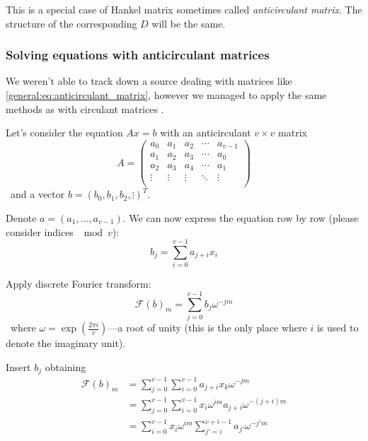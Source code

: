     This is a special case of Hankel matrix sometimes called \emph{anticirculant matrix}. The structure of the corresponding $D$ will be the same.
    
    \subsubsection{Solving equations with anticirculant matrices}
    \label{general:sec:anticirculant}
        We weren't able to track down a source dealing with matrices like \eqref{general:eq:anticirculant_matrix}, however we managed to apply the same methods as with circulant matrices \cite{wiki:circulant_matrix}.
        
        Let's consider the equation $Ax=b$ with an anticirculant $v \times v$ matrix
        \begin{equation}
            A =
            \begin{pmatrix}
                a_0 & a_1 & a_2 & \cdots & a_{v-1} \\ 
                a_1 & a_2 & a_3 & \cdots & a_0 \\
                a_2 & a_3 & a_4 & \cdots & a_1 \\
                \vdots & \vdots & \vdots & \ddots & \vdots \\
            \end{pmatrix}
        \end{equation}\
        and a vector $b=(b_0, b_1, b_2, \vdots)^T$. 
        
        Denote $a=(a_1,\ldots,a_{v-1})$. We can now express the equation row by row (please consider indices $\mod v$):
        \begin{equation}
            b_j = \sum_{i=0}^{v-1} a_{j+i} x_i
        \end{equation}
        
        Apply discrete Fourier transform:
        \begin{equation}
            \mathcal{F} (b)_m = \sum_{j=0}^{v-1} b_j \omega^{-jm}
        \end{equation}\
        where $\omega = \exp(\frac{2\pi i}v)$---a root of unity (this is the only place where $i$ is used to denote the imaginary unit).
        
        Insert $b_j$ obtaining
        \begin{equation}
        \begin{split}
            \mathcal{F} (b)_m
            &= \sum_{j=0}^{v-1} \sum_{i=0}^{v-1} a_{j+i} x_k \omega^{-jm} \\
            &= \sum_{j=0}^{v-1} \sum_{i=0}^{v-1} x_i \omega^{im} a_{j+i} \omega^{-(j+i)m}  \\
            &= \sum_{i=0}^{v-1} x_i \omega^{im} \sum_{j'=i}^{v+i-1} a_{j'} \omega^{-j'm}
        \end{split}
        \end{equation}
        
